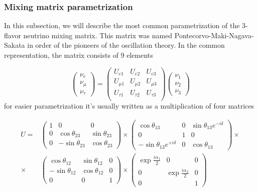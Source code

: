 \documentclass[../main.tex]{subfiles}
\begin{document}
\subsubsection{Mixing matrix parametrization}
In this subsection, we will describe the most common parametrization of the 3-flavor neutrino mixing matrix. This matrix was named Pontecorvo-Maki-Nagava-Sakata in order of the pioneers of the oscillation theory. In the common representation, the matrix consists of 9 elements

\begin{equation}
\begin{pmatrix}
\nu_e \\ \nu_\mu \\ \nu_\tau
\end{pmatrix}
=
\begin{pmatrix}
U_{e1} & U_{e2} & U_{e3} \\
U_{\mu 1} & U_{\mu 2} & U_{\mu 3} \\
U_{\tau 1} & U_{\tau 2} & U_{\tau 3} \\
\end{pmatrix}
\begin{pmatrix}
\nu_1 \\ \nu_2 \\ \nu_3
\end{pmatrix}
\end{equation}
for easier parametrization it's usually written as a multiplication of four matrices

\begin{align}
\nonumber
U=&
\begin{pmatrix}
1   & 0                 & 0 \\
0   & \cos\theta_{23}   & \sin\theta_{23} \\
0   & -\sin\theta_{23}  & \cos\theta_{23}
\end{pmatrix}
\times
\begin{pmatrix}
\cos\theta_{13}                           & 0     & \sin\theta_{13}e^{-i\delta} \\
0                                         & 1     & 0 \\
-\sin\theta_{13}e^{+i\delta}              & 0     & \cos\theta_{13}
\end{pmatrix} \times \\
\times &
\begin{pmatrix}
\cos\theta_{12}   & \sin\theta_{12} & 0 \\
-\sin\theta_{12}  & \cos\theta_{12} & 0 \\
0                 & 0               & 1
\end{pmatrix}
\times
\begin{pmatrix}
\exp\frac{i\alpha_1}{2}   & 0                         & 0 \\
0                         & \exp\frac{i\alpha_2}{2}   & 0 \\
0                         &                           & 1
\end{pmatrix}
\label{eq:intro:osc_param}
\end{align}
\end{document}
